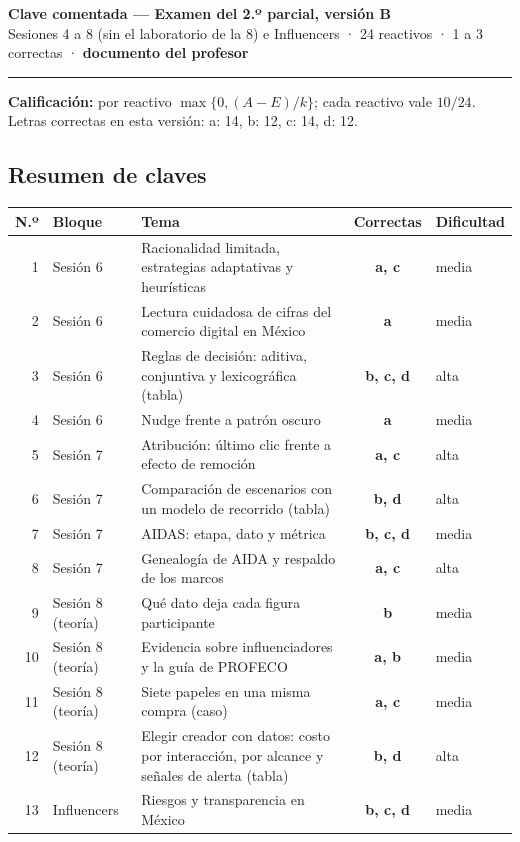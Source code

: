 \documentclass[10pt,letterpaper]{article}
\begin{document}
{\color{guinda}\large\textbf{Clave comentada — Examen del 2.º parcial, versión B}}\\
{\small Sesiones 4 a 8 (sin el laboratorio de la 8) e Influencers · 24 reactivos · 1 a 3 correctas · \textbf{documento del profesor}}
\vspace{4pt}\hrule\vspace{4pt}
\textbf{Calificación:} por reactivo $\max\{0,(A-E)/k\}$; cada reactivo vale $10/24$. Letras correctas en esta versión: a: 14, b: 12, c: 14, d: 12.
\subsection*{Resumen de claves}\begin{center}\footnotesize\begin{tabular}{@{}rllcl@{}}\toprule N.º & Bloque & Tema & Correctas & Dificultad\\\midrule
1 & Sesión 6 & Racionalidad limitada, estrategias adaptativas y heurísticas & \textbf{a, c} & media\\
2 & Sesión 6 & Lectura cuidadosa de cifras del comercio digital en México & \textbf{a} & media\\
3 & Sesión 6 & Reglas de decisión: aditiva, conjuntiva y lexicográfica (tabla) & \textbf{b, c, d} & alta\\
4 & Sesión 6 & Nudge frente a patrón oscuro & \textbf{a} & media\\
5 & Sesión 7 & Atribución: último clic frente a efecto de remoción & \textbf{a, c} & alta\\
6 & Sesión 7 & Comparación de escenarios con un modelo de recorrido (tabla) & \textbf{b, d} & alta\\
7 & Sesión 7 & AIDAS: etapa, dato y métrica & \textbf{b, c, d} & media\\
8 & Sesión 7 & Genealogía de AIDA y respaldo de los marcos & \textbf{a, c} & alta\\
9 & Sesión 8 (teoría) & Qué dato deja cada figura participante & \textbf{b} & media\\
10 & Sesión 8 (teoría) & Evidencia sobre influenciadores y la guía de PROFECO & \textbf{a, b} & media\\
11 & Sesión 8 (teoría) & Siete papeles en una misma compra (caso) & \textbf{a, c} & media\\
12 & Sesión 8 (teoría) & Elegir creador con datos: costo por interacción, por alcance y señales de alerta (tabla) & \textbf{b, d} & alta\\
13 & Influencers & Riesgos y transparencia en México & \textbf{b, c, d} & media\\

\end{tabular}
\end{center}
\end{document}

